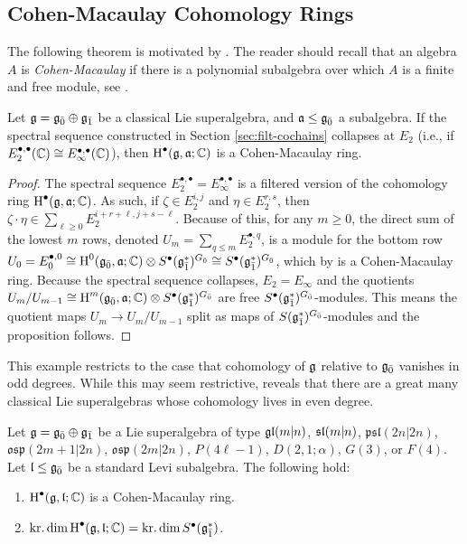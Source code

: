 \subsection{Cohen-Macaulay Cohomology Rings}
\label{sec:cm-H*}

The following theorem is motivated by \cite[Proposition 3.1]{MR3233523}. The reader should recall that an algebra $A$ is \emph{Cohen-Macaulay} if there is a polynomial subalgebra over which $A$ is a finite and free module, see \cite[\S 5.4]{MR1634407}.

\begin{proposition}
  \label{prop:collapse-CM}
  Let $\g = \even{\g} \oplus \odd{\g}$ be a classical Lie superalgebra, and $\a \leq \even{\g}$ a subalgebra. If the spectral sequence constructed in Section \ref{sec:filt-cochains} collapses at $E_2$ (i.e., if $E_2^{\bullet,\bullet}(\CC) \cong E_\infty^{\bullet,\bullet}(\CC)$), then $\H^\bullet(\g,\a;\CC)$ is a Cohen-Macaulay ring.
\end{proposition}
\begin{proof}
  The spectral sequence $E_2^{\bullet,\bullet} = E_\infty^{\bullet,\bullet}$ is a filtered version of the cohomology ring $\H^\bullet(\g,\a;\CC)$. As such, if $\zeta \in E_2^{i,j}$ and $\eta \in E_2^{r,s}$, then $\zeta \cdot \eta \in \sum_{\ell \geq 0} E_2^{i + r + \ell, j + s - \ell}$. Because of this, for any $m \geq 0$, the direct sum of the lowest $m$ rows, denoted $U_m = \sum_{q \leq m} E_2^{\bullet,q}$, is a module for the bottom row $U_0 = E_0^{\bullet,0} \cong \H^0(\even{\g},\a;\CC) \otimes S^\bullet(\odd{\g}^*)^{\even{G}} \cong S^\bullet(\odd{\g}^*)^{\even{G}}$, which by \cite{MR0347810} is a Cohen-Macaulay ring. Because the spectral sequence collapses, $E_2 = E_\infty$ and the quotients $U_m / U_{m-1} \cong \H^m(\even{\g},\a;\CC) \otimes S^\bullet(\odd{\g}^*)^{\even{G}}$ are free $S^\bullet(\odd{\g}^*)^{\even{G}}$-modules. This means the quotient maps $U_m \to U_m / U_{m-1}$ split as maps of $S(\odd{\g}^*)^{\even{G}}$-modules and the proposition follows.
\end{proof}

This example restricts to the case that cohomology of $\g$ relative to $\even{\g}$ vanishes in odd degrees. While this may seem restrictive, \cite[Table 1]{BKN-1} reveals that there are a great many classical Lie superalgebras whose cohomology lives in even degree.

\begin{corollary}
  Let $\g = \even{\g} \oplus \odd{\g}$ be a Lie superalgebra of type $\gl(m|n)$, $\sl(m|n)$, $\mathfrak{psl}(2n|2n)$, $\mathfrak{osp}(2m+1|2n)$, $\mathfrak{osp}(2m|2n)$, $P(4\ell - 1)$, $D(2,1;\alpha)$, $G(3)$, or $F(4)$. Let $\l \leq \even{\g}$ be a standard Levi subalgebra. The following hold:
  \begin{enumerate}[\indent\rm(a)]
  \item $\H^\bullet(\g,\l;\CC)$ is a Cohen-Macaulay ring.
  \item $\krdim \H^\bullet(\g,\l;\CC) = \krdim S^\bullet(\odd{\g}^*)$.
  \end{enumerate}
\end{corollary}


